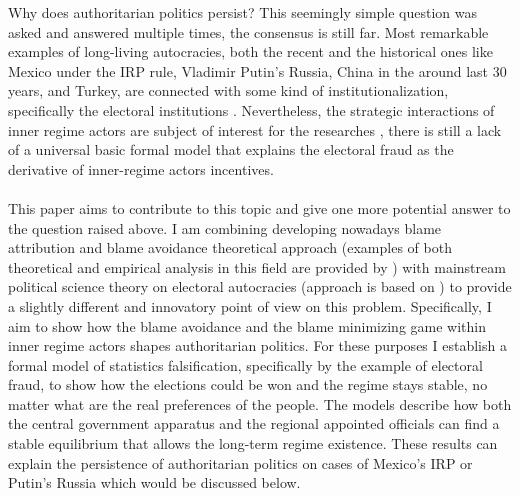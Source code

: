 \documentclass[a4paper, 12pt]{article}
\begin{document}
    Why does authoritarian politics persist? This seemingly simple question was asked and answered multiple times, the consensus is still far. Most remarkable examples of long-living autocracies, both the recent and the historical ones like Mexico under the IRP rule, Vladimir Putin's Russia, China in the around last 30 years, and Turkey, are connected with some kind of institutionalization, specifically the electoral institutions \parencite{votingforautocracy, shedler, institutions}. Nevertheless, the strategic interactions of inner regime actors are subject of interest for the researches \parencite{officialmanipulates, morethanwin}, there is still a lack of a universal basic formal model that explains the electoral fraud as the derivative of inner-regime actors incentives.
    \\\\
    This paper aims to contribute to this topic and give one more potential answer to the question raised above. I am combining developing nowadays
    blame attribution and blame avoidance theoretical approach (examples of both theoretical and empirical analysis in this field are provided by \cite{Hood2009, Bovens2007}) with mainstream political science theory on electoral autocracies (approach is based on \cite{competition, shedler}) to provide a slightly different and innovatory point of view on this problem. Specifically, I aim to show how the blame avoidance and the blame minimizing game within inner regime actors shapes  authoritarian politics. For these purposes I establish a formal model of statistics falsification, specifically by the example of electoral fraud, to show how the elections could be won and the regime stays stable, no matter what are the real preferences of the people. The models describe how both the central government apparatus and the regional appointed officials can find a stable equilibrium that allows the long-term regime existence. These results can explain the persistence of authoritarian politics on cases of Mexico's IRP or Putin's Russia which would be discussed below.
    \\\\
\end{document}

